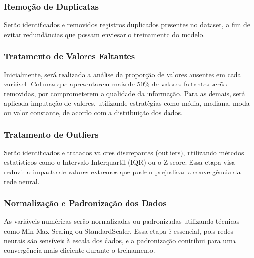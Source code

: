 \documentclass[11pt]{article}
\begin{document}
\subsubsection{Remoção de Duplicatas}\label{remouxe7uxe3o-de-duplicatas}

Serão identificados e removidos registros duplicados presentes no
dataset, a fim de evitar redundâncias que possam enviesar o treinamento
do modelo.

\subsubsection{Tratamento de Valores
Faltantes}\label{tratamento-de-valores-faltantes}

Inicialmente, será realizada a análise da proporção de valores ausentes
em cada variável. Colunas que apresentarem mais de 50\% de valores
faltantes serão removidas, por comprometerem a qualidade da informação.
Para as demais, será aplicada imputação de valores, utilizando
estratégias como média, mediana, moda ou valor constante, de acordo com
a distribuição dos dados.

\subsubsection{Tratamento de Outliers}\label{tratamento-de-outliers}

Serão identificados e tratados valores discrepantes (outliers),
utilizando métodos estatísticos como o Intervalo Interquartil (IQR) ou o
Z-score. Essa etapa visa reduzir o impacto de valores extremos que podem
prejudicar a convergência da rede neural.

\subsubsection{Normalização e Padronização dos
Dados}\label{normalizauxe7uxe3o-e-padronizauxe7uxe3o-dos-dados}

As variáveis numéricas serão normalizadas ou padronizadas utilizando
técnicas como Min-Max Scaling ou StandardScaler. Essa etapa é essencial,
pois redes neurais são sensíveis à escala dos dados, e a padronização
contribui para uma convergência mais eficiente durante o treinamento.
\end{document}
